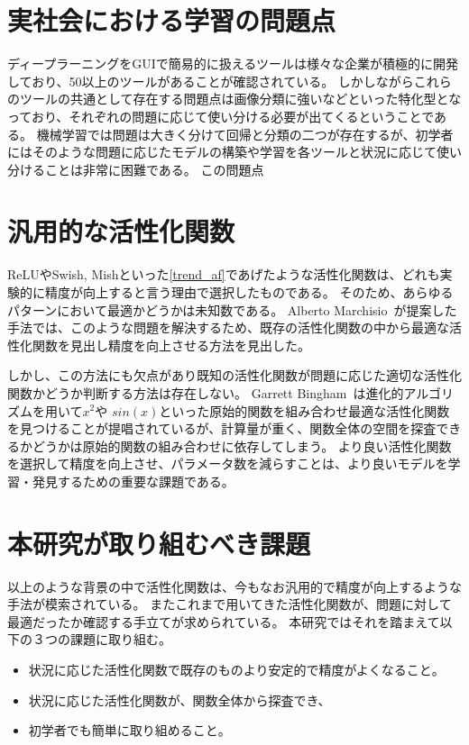 \section{実社会における学習の問題点}

ディープラーニングをGUIで簡易的に扱えるツールは様々な企業が積極的に開発しており、50以上のツールがあることが確認されている。
しかしながらこれらのツールの共通として存在する問題点は画像分類に強いなどといった特化型となっており、それぞれの問題に応じて使い分ける必要が出てくるということである。
機械学習では問題は大きく分けて回帰と分類の二つが存在するが、初学者にはそのような問題に応じたモデルの構築や学習を各ツールと状況に応じて使い分けることは非常に困難である。
この問題点


\section{汎用的な活性化関数}

ReLUやSwish, Mishといった\ref{trend_af}であげたような活性化関数は、どれも実験的に精度が向上すると言う理由で選択したものである。
そのため、あらゆるパターンにおいて最適かどうかは未知数である。
Alberto Marchisio~\cite{automatic_af}が提案した手法では、このような問題を解決するため、既存の活性化関数の中から最適な活性化関数を見出し精度を向上させる方法を見出した。

しかし、この方法にも欠点があり既知の活性化関数が問題に応じた適切な活性化関数かどうか判断する方法は存在しない。
Garrett Bingham~\cite{evo_af}は進化的アルゴリズムを用いて$ x^2 $や $ sin(x) $といった原始的関数を組み合わせ最適な活性化関数を見つけることが提唱されているが、計算量が重く、関数全体の空間を探査できるかどうかは原始的関数の組み合わせに依存してしまう。
より良い活性化関数を選択して精度を向上させ、パラメータ数を減らすことは、より良いモデルを学習・発見するための重要な課題である。




\section{本研究が取り組むべき課題}

以上のような背景の中で活性化関数は、今もなお汎用的で精度が向上するような手法が模索されている。
またこれまで用いてきた活性化関数が、問題に対して最適だったか確認する手立てが求められている。
本研究ではそれを踏まえて以下の３つの課題に取り組む。

\begin{itemize}
  \item 状況に応じた活性化関数で既存のものより安定的で精度がよくなること。
  \item 状況に応じた活性化関数が、関数全体から探査でき、
  \item 初学者でも簡単に取り組めること。
\end{itemize}



